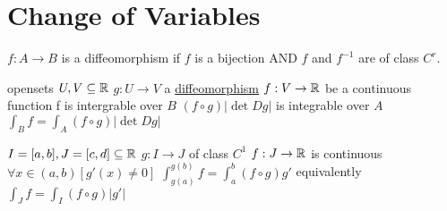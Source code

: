 \section{Change of Variables}

 

$f: A\to B$ is a diffeomorphism if
$f$ is a bijection AND $f$ and $f^{-1}$ are of class $C^r$.


 
\begin{tTheorem}
\tLET
opensets $U, V \subseteq {\mathbb R}$\newline
$g: U\to V$ a \hyperref[kw:diffeomorphism]{diffeomorphism}\newline
$f:V\to {\mathbb R}$ be a continuous function
\tTHEN f is intergrable over $B$\newline
  \IFF $(f\circ g)|\det D g|$ is integrable over $A$
\tNOTE $\int_B f = \int_A(f\circ g)|\det D g|$
\end{tTheorem}

 
\begin{tTheorem}
\tLET
$I=[a,b], J=[c,d]\subseteq{\mathbb R}$\newline
$g:I\to J$ of class $C^1$\newline
$f:J\to {\mathbb R}$ is continuous
\tIF $\forall x\in(a,b) \left[g'(x)\neq 0\right]$
\tTHEN $\int^{g(b)}_{g(a)}f=\int^b_a (f\circ g)g'$\newline
equivalently $\int_J f=\int_I (f\circ g)|g'|$
\end{tTheorem}